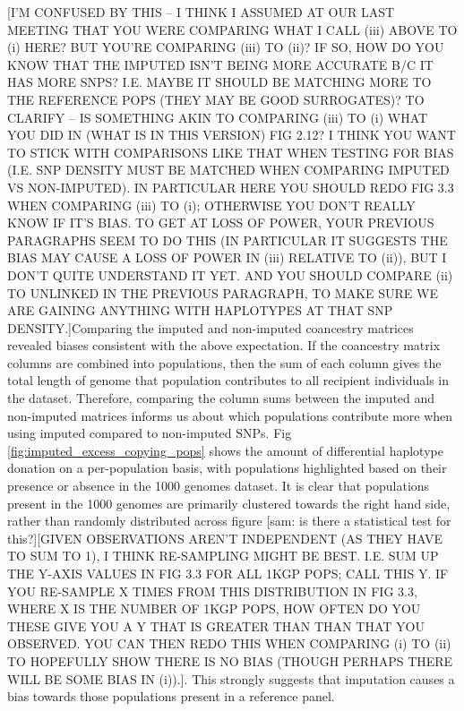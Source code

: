 {\color{red}[I'M CONFUSED BY THIS -- I THINK I ASSUMED AT OUR LAST MEETING THAT YOU WERE COMPARING WHAT I CALL (iii) ABOVE TO (i) HERE? BUT YOU'RE COMPARING (iii) TO (ii)? IF SO, HOW DO YOU KNOW THAT THE IMPUTED ISN'T BEING MORE ACCURATE B/C IT HAS MORE SNPS? I.E. MAYBE IT SHOULD BE MATCHING MORE TO THE REFERENCE POPS (THEY MAY BE GOOD SURROGATES)? TO CLARIFY -- IS SOMETHING AKIN TO COMPARING (iii) TO (i) WHAT YOU DID IN (WHAT IS IN THIS VERSION) FIG 2.12? I THINK YOU WANT TO STICK WITH COMPARISONS LIKE THAT WHEN TESTING FOR BIAS (I.E. SNP DENSITY MUST BE MATCHED WHEN COMPARING IMPUTED VS NON-IMPUTED). IN PARTICULAR HERE YOU SHOULD REDO FIG 3.3 WHEN COMPARING (iii) TO (i); OTHERWISE YOU DON'T REALLY KNOW IF IT'S BIAS. TO GET AT LOSS OF POWER, YOUR PREVIOUS PARAGRAPHS SEEM TO DO THIS (IN PARTICULAR IT SUGGESTS THE BIAS MAY CAUSE A LOSS OF POWER IN (iii) RELATIVE TO (ii)), BUT I DON'T QUITE UNDERSTAND IT YET. AND YOU SHOULD COMPARE (ii) TO UNLINKED IN THE PREVIOUS PARAGRAPH, TO MAKE SURE WE ARE GAINING ANYTHING WITH HAPLOTYPES AT THAT SNP DENSITY.]}Comparing the imputed and non-imputed coancestry matrices revealed biases consistent with the above expectation. If the coancestry matrix columns are combined into populations, then the sum of each column gives the total length of genome that population contributes to all recipient individuals in the dataset. Therefore, comparing the column sums between the imputed and non-imputed matrices informs us about which populations contribute more when using imputed compared to non-imputed SNPs. Fig \ref{fig:imputed_excess_copying_pops} shows the amount of differential haplotype donation on a per-population basis, with populations highlighted based on their presence or absence in the 1000 genomes dataset. It is clear that populations present in the 1000 genomes are primarily clustered towards the right hand side, rather than randomly distributed across figure [sam: is there a statistical test for this?]{\color{red}[GIVEN OBSERVATIONS AREN'T INDEPENDENT (AS THEY HAVE TO SUM TO 1), I THINK RE-SAMPLING MIGHT BE BEST. I.E. SUM UP THE Y-AXIS VALUES IN FIG 3.3 FOR ALL 1KGP POPS; CALL THIS Y. IF YOU RE-SAMPLE X TIMES FROM THIS DISTRIBUTION IN FIG 3.3, WHERE X IS THE NUMBER OF 1KGP POPS, HOW OFTEN DO YOU THESE GIVE YOU A Y THAT IS GREATER THAN THAN THAT YOU OBSERVED. YOU CAN THEN REDO THIS WHEN COMPARING (i) TO (ii) TO HOPEFULLY SHOW THERE IS NO BIAS (THOUGH PERHAPS THERE WILL BE SOME BIAS IN (i)).]}. This strongly suggests that imputation causes a bias towards those populations present in a reference panel. 

